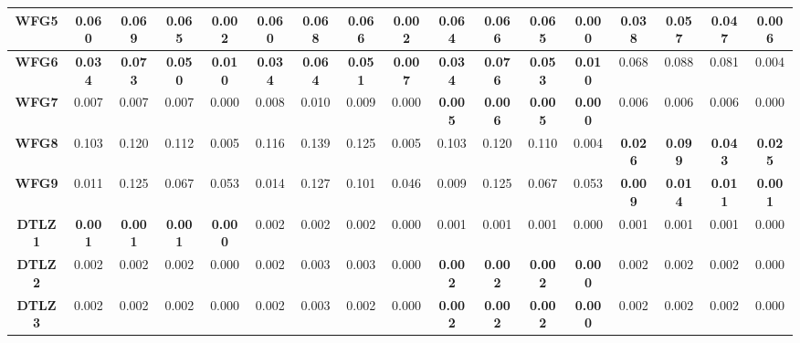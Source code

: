 \begin{table*}[t]
\begin{scriptsize}
\begin{tabular}{cc|c|c|c|c|c|c|c|c|c|c|c|c|c|c|c}
\multicolumn{1}{c|}{\textbf{WFG5}}  & 0.060          & 0.069          & 0.065          & 0.002          & 0.060          & 0.068          & 0.066          & 0.002          & 0.064          & 0.066          & 0.065          & 0.000          & \textbf{0.038} & \textbf{0.057} & \textbf{0.047} & \textbf{0.006} \\ \hline
\multicolumn{1}{c|}{\textbf{WFG6}}  & \textbf{0.034} & \textbf{0.073} & \textbf{0.050} & \textbf{0.010} & \textbf{0.034} & \textbf{0.064} & \textbf{0.051} & \textbf{0.007} & \textbf{0.034} & \textbf{0.076} & \textbf{0.053} & \textbf{0.010} & 0.068          & 0.088          & 0.081          & 0.004          \\ \hline
\multicolumn{1}{c|}{\textbf{WFG7}}  & 0.007          & 0.007          & 0.007          & 0.000          & 0.008          & 0.010          & 0.009          & 0.000          & \textbf{0.005} & \textbf{0.006} & \textbf{0.005} & \textbf{0.000} & 0.006          & 0.006          & 0.006          & 0.000          \\ \hline
\multicolumn{1}{c|}{\textbf{WFG8}}  & 0.103          & 0.120          & 0.112          & 0.005          & 0.116          & 0.139          & 0.125          & 0.005          & 0.103          & 0.120          & 0.110          & 0.004          & \textbf{0.026} & \textbf{0.099} & \textbf{0.043} & \textbf{0.025} \\ \hline
\multicolumn{1}{c|}{\textbf{WFG9}}  & 0.011          & 0.125          & 0.067          & 0.053          & 0.014          & 0.127          & 0.101          & 0.046          & 0.009          & 0.125          & 0.067          & 0.053          & \textbf{0.009} & \textbf{0.014} & \textbf{0.011} & \textbf{0.001} \\ \hline
\multicolumn{1}{c|}{\textbf{DTLZ1}} & \textbf{0.001} & \textbf{0.001} & \textbf{0.001} & \textbf{0.000} & 0.002          & 0.002          & 0.002          & 0.000          & 0.001          & 0.001          & 0.001          & 0.000          & 0.001          & 0.001          & 0.001          & 0.000          \\ \hline
\multicolumn{1}{c|}{\textbf{DTLZ2}} & 0.002          & 0.002          & 0.002          & 0.000          & 0.002          & 0.003          & 0.003          & 0.000          & \textbf{0.002} & \textbf{0.002} & \textbf{0.002} & \textbf{0.000} & 0.002          & 0.002          & 0.002          & 0.000          \\ \hline
\multicolumn{1}{c|}{\textbf{DTLZ3}} & 0.002          & 0.002          & 0.002          & 0.000          & 0.002          & 0.003          & 0.002          & 0.000          & \textbf{0.002} & \textbf{0.002} & \textbf{0.002} & \textbf{0.000} & 0.002          & 0.002          & 0.002          & 0.000          \\ \hline

\end{tabular}
\end{scriptsize}
\end{table*}
